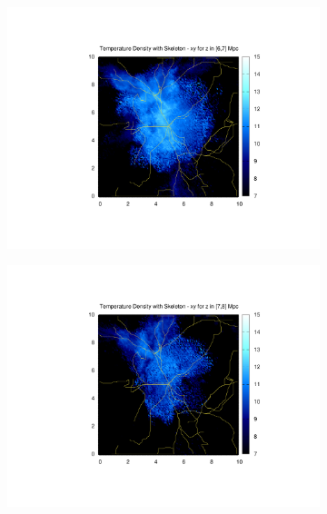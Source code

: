\documentclass[journal]{IEEEtran}
\begin{document}
\begin{figure}[!t]
\begin{subfigure}[t]{0.3\textwidth}
		\includegraphics[width=\linewidth]{TempDenSkel07.pdf}
	\end{subfigure}
	\quad
	\begin{subfigure}[t]{0.3\textwidth}
		\centering
		\includegraphics[width=\linewidth]{TempDenSkel08.pdf}
	\end{subfigure}
	\quad
	\begin{subfigure}[t]{0.3\textwidth}
		\centering

\end{subfigure}
\end{figure}
\end{document}
